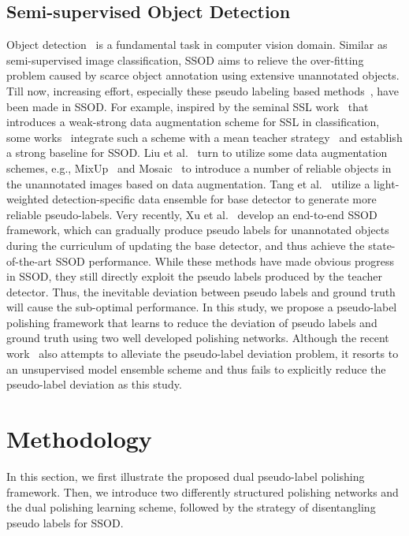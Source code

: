 \documentclass[letterpaper]{article} \usepackage{aaai23}  \usepackage{times}  \usepackage{helvet}  \usepackage{courier}  \usepackage[hyphens]{url}  \usepackage{graphicx} \urlstyle{rm} \def\UrlFont{\rm}  \usepackage{natbib}  \usepackage{caption} \frenchspacing  \setlength{\pdfpagewidth}{8.5in}  \setlength{\pdfpageheight}{11in}  \usepackage{algorithm}
\begin{document}
\subsection{Semi-supervised Object Detection}
Object detection~\cite{NIPS2015_14bfa6bb,Lin_2017_ICCV,Lin_2017_CVPR,redmon2018yolov3,zhang2020bridging} is a fundamental task in computer vision domain. Similar as semi-supervised image classification, SSOD aims to relieve the over-fitting problem caused by scarce object annotation using extensive unannotated objects. Till now, increasing effort, especially these pseudo labeling based methods~\cite{sohn2020simple,zhou2021instant,tang2021humble,liu2021unbiased,xu2021end}, have been made in SSOD. For example, inspired by the seminal SSL work~\cite{sohn2020simple} that introduces a weak-strong data augmentation scheme for SSL in classification, some works~\cite{zhou2021instant,tang2021humble,liu2021unbiased,xu2021end} integrate such a scheme with a mean teacher strategy~\cite{tarvainen2017mean} and establish a strong baseline for SSOD. Liu et al.~\cite{liu2021unbiased} turn to utilize some data augmentation schemes, e.g., MixUp~\cite{zhang2018mixup} and Mosaic~\cite{bochkovskiy2020yolov4} to introduce a number of reliable objects in the unannotated images based on data augmentation. Tang et al.~\cite{tang2021humble} utilize a light-weighted detection-specific data ensemble for base detector to generate more reliable pseudo-labels. 
Very recently, Xu et al.~\cite{xu2021end} develop an end-to-end SSOD framework, which can gradually produce pseudo labels for unannotated objects during the curriculum of updating the base detector, and thus achieve the state-of-the-art SSOD performance. While these methods have made obvious progress in SSOD, they still directly exploit the pseudo labels produced by the teacher detector. Thus, the inevitable deviation between pseudo labels and ground truth will cause the sub-optimal performance. In this study, we propose a pseudo-label polishing framework that learns to reduce the deviation of pseudo labels and ground truth using two well developed polishing networks. Although the recent work~\cite{zhou2021instant} also attempts to alleviate the pseudo-label deviation problem, it resorts to an unsupervised model ensemble scheme and thus fails to explicitly reduce the pseudo-label deviation as this study. 

\section{Methodology}
In this section, we first illustrate the proposed dual pseudo-label polishing framework. Then, we introduce two differently structured polishing networks and the dual polishing learning scheme, followed by the strategy of disentangling pseudo labels for SSOD.
\end{document}
